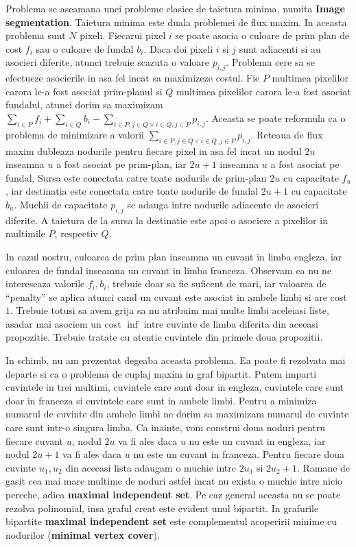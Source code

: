 Problema se aseamana unei probleme clasice de taietura minima, numita \textbf{Image segmentation}. Taietura minima este duala
problemei de flux maxim. In aceasta problema sunt $N$ pixeli. Fiecarui pixel $i$ se poate asocia o culoare de prim plan de cost
$f_{i}$ sau o culoare de fundal $b_{i}$. Daca doi pixeli $i$ si $j$ sunt adiacenti si au asocieri diferite, atunci trebuie scazuta
o valoare $p_{i,j}$. Problema cere sa se efectueze asocierile in asa fel incat sa maximizeze costul. Fie $P$ multimea pixelilor carora
le-a fost asociat prim-planul si $Q$ multimea pixelilor carora le-a fost asociat fundalul, atunci dorim sa maximizam
$\sum_{i \in P} f_{i} + \sum_{i \in Q} b_{i} - \sum_{i \in P, j \in Q \lor i \in Q, j \in P} p_{i,j}$. Aceasta se poate reformula ca o problema
de minimizare a valorii $\sum_{i \in P, j \in Q \lor i \in Q, j \in P} p_{i,j}$. Reteaua de flux maxim dubleaza nodurile pentru fiecare pixel
in asa fel incat un nodul $2u$ inseamna $u$ a fost asociat pe prim-plan, iar $2u+1$ inseamna $u$ a fost asociat pe fundal. Sursa este
conectata catre toate nodurile de prim-plan $2u$ cu capacitate $f_{u}$, iar destinatia este conectata catre toate nodurile de fundal $2u+1$
cu capacitate $b_{u}$. Muchii de capacitate $p_{i,j}$ se adauga intre nodurile adiacente de asocieri diferite. A taietura de la sursa la
destinatie este apoi o asociere a pixelilor in multimile $P$, respectiv $Q$.

In cazul nostru, culoarea de prim plan inseamna un cuvant in limba engleza, iar culoarea de fundal inseamna un cuvant in limba franceza.
Observam ca nu ne intereseaza valorile $f_{i}, b_{i}$, trebuie doar sa fie suficent de mari, iar valoarea de ``penalty'' se aplica atunci cand
un cuvant este asociat in ambele limbi si are cost $1$. Trebuie totusi sa avem grija sa nu atribuim mai multe limbi aceleiasi liste, asadar mai
asociem un cost $\inf$ intre cuvinte de limba diferita din aceeasi propozitie. Trebuie tratate cu atentie cuvintele din primele doua propozitii.

In schimb, nu am prezentat degeaba aceasta problema. Ea poate fi rezolvata mai departe si ca o problema de cuplaj maxim in graf bipartit.
Putem imparti cuvintele in trei multimi, cuvintele care sunt doar in engleza, cuvintele care sunt doar in franceza si cuvintele
care sunt in ambele limbi. Pentru a minimiza numarul de cuvinte din ambele limbi ne dorim sa maximizam numarul de cuvinte care sunt intr-o
singura limba. Ca inainte, vom construi doua noduri pentru fiecare cuvant $u$, nodul $2u$ va fi ales daca $u$ nu este un cuvant in engleza,
iar nodul $2u + 1$ va fi ales daca $u$ nu este un cuvant in franceza. Pentru fiecare doua cuvinte $u_{1}, u_{2}$ din aceeasi lista adaugam o
muchie intre $2u_{1}$ si $2u_{2} + 1$. Ramane de gasit cea mai mare multime de noduri astfel incat nu exista o muchie intre nicio pereche, adica
\textbf{maximal independent set}. Pe caz general aceasta nu se poate rezolva polinomial, insa graful creat este evident unul bipartit. In grafurile
bipartite \textbf{maximal independent set} este complementul acoperirii minime cu nodurilor (\textbf{minimal vertex cover}).

